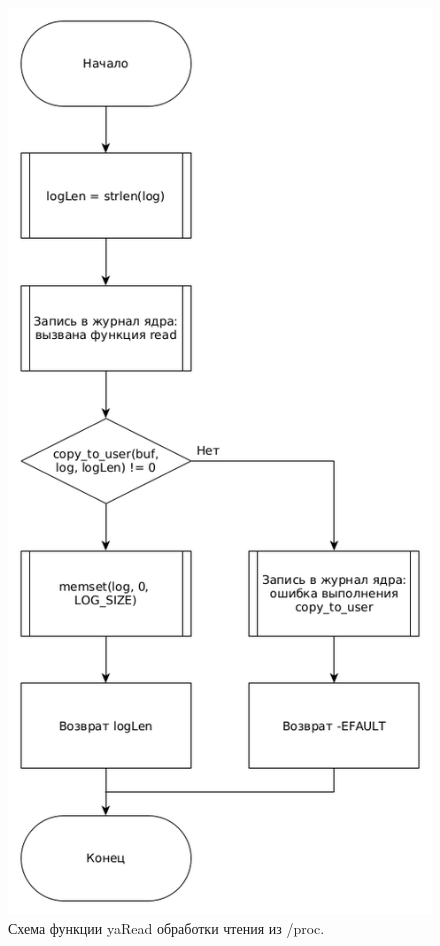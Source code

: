 \begin{figure}[H]
	\centering
	\includegraphics[scale=0.5]{img/yaRead.png}
	\caption{Схема функции yaRead обработки чтения из /proc. }
	\label{fig:read}
\end{figure}

